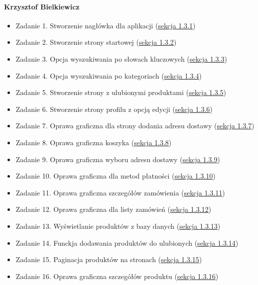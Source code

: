 \documentclass[12pt,a4paper,oneside]{article}
\theoremstyle{definition}
\numberwithin{equation}{section}
\begin{document}
\paragraph{Krzysztof Bielkiewicz}
\begin{itemize}
    \item Zadanie 1. Stworzenie nagłówka dla aplikacji (\hyperref[1.3.1]{sekcja 1.3.1})
    \item Zadanie 2. Stworzenie strony startowej (\hyperref[1.3.2]{sekcja 1.3.2})
    \item Zadanie 3. Opcja wyszukiwania po słowach kluczowych (\hyperref[1.3.3]{sekcja 1.3.3})
    \item Zadanie 4. Opcja wyszukiwania po kategoriach (\hyperref[1.3.4]{sekcja 1.3.4})
    \item Zadanie 5. Stworzenie strony z ulubionymi produktami (\hyperref[1.3.5]{sekcja 1.3.5})
    \item Zadanie 6. Stworzenie strony profilu z opcją edycji (\hyperref[1.3.6]{sekcja 1.3.6})
    \item Zadanie 7. Oprawa graficzna dla strony dodania adresu dostawy (\hyperref[1.3.7]{sekcja 1.3.7})
    \item Zadanie 8. Oprawa graficzna koszyka (\hyperref[1.3.8]{sekcja 1.3.8})
    \item Zadanie 9. Oprawa graficzna wyboru adresu dostawy (\hyperref[1.3.9]{sekcja 1.3.9})
    \item Zadanie 10. Oprawa graficzna dla metod płatności (\hyperref[1.3.10]{sekcja 1.3.10})
    \item Zadanie 11. Oprawa graficzna szczegółów zamówienia (\hyperref[1.3.11]{sekcja 1.3.11})
    \item Zadanie 12. Oprawa graficzna dla listy zamówień (\hyperref[1.3.12]{sekcja 1.3.12})
    \item Zadanie 13. Wyświetlanie produktów z bazy danych (\hyperref[1.3.13]{sekcja 1.3.13})
    \item Zadanie 14. Funckja dodawania produktów do ulubionych (\hyperref[1.3.14]{sekcja 1.3.14})
    \item Zadanie 15. Paginacja produktów na stronach (\hyperref[1.3.15]{sekcja 1.3.15})
    \item Zadanie 16. Oprawa graficzna szczegółów produktu (\hyperref[1.3.16]{sekcja 1.3.16})
\end{itemize}
\end{document}
